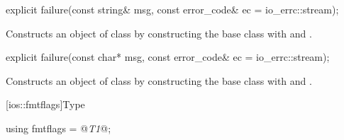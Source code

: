 %
\begin{itemdecl}
explicit failure(const string& msg, const error_code& ec = io_errc::stream);
\end{itemdecl}

\begin{itemdescr}
\pnum
\effects
Constructs an object of class
 by constructing the base class with  and .
\end{itemdescr}

%
\begin{itemdecl}
explicit failure(const char* msg, const error_code& ec = io_errc::stream);
\end{itemdecl}

\begin{itemdescr}
\pnum
\effects
Constructs an object of class
 by constructing the base class with  and .
\end{itemdescr}

[ios::fmtflags]{Type }

%
\begin{itemdecl}
using fmtflags = @\textit{T1}@;
\end{itemdecl}

